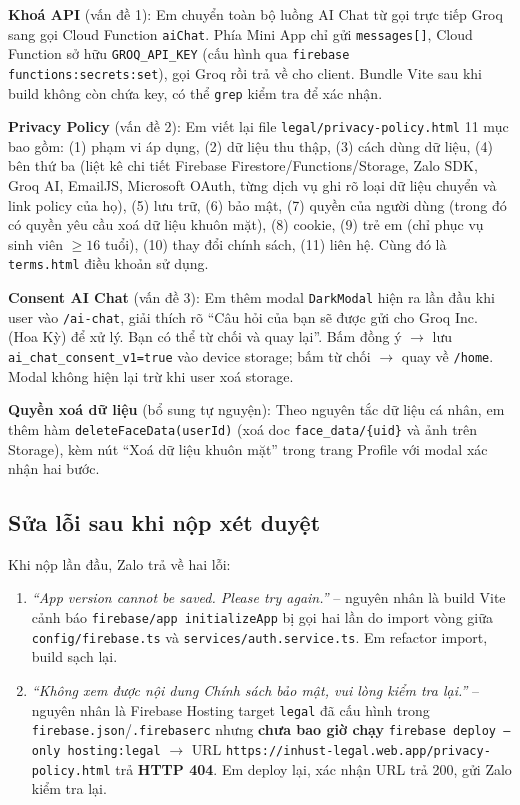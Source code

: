 \documentclass{article}
\begin{document}
\textbf{Khoá API} (vấn đề 1): Em chuyển toàn bộ luồng AI Chat từ gọi trực tiếp Groq sang gọi Cloud Function \texttt{aiChat}. Phía Mini App chỉ gửi \texttt{messages[]}, Cloud Function sở hữu \texttt{GROQ\_API\_KEY} (cấu hình qua \texttt{firebase functions:secrets:set}), gọi Groq rồi trả về cho client. Bundle Vite sau khi build không còn chứa key, có thể \texttt{grep} kiểm tra để xác nhận.

\textbf{Privacy Policy} (vấn đề 2): Em viết lại file \texttt{legal/privacy-policy.html} 11 mục bao gồm: (1) phạm vi áp dụng, (2) dữ liệu thu thập, (3) cách dùng dữ liệu, (4) bên thứ ba (liệt kê chi tiết Firebase Firestore/Functions/Storage, Zalo SDK, Groq AI, EmailJS, Microsoft OAuth, từng dịch vụ ghi rõ loại dữ liệu chuyển và link policy của họ), (5) lưu trữ, (6) bảo mật, (7) quyền của người dùng (trong đó có quyền yêu cầu xoá dữ liệu khuôn mặt), (8) cookie, (9) trẻ em (chỉ phục vụ sinh viên $\geq 16$ tuổi), (10) thay đổi chính sách, (11) liên hệ. Cùng đó là \texttt{terms.html} điều khoản sử dụng.

\textbf{Consent AI Chat} (vấn đề 3): Em thêm modal \texttt{DarkModal} hiện ra lần đầu khi user vào \texttt{/ai-chat}, giải thích rõ ``Câu hỏi của bạn sẽ được gửi cho Groq Inc. (Hoa Kỳ) để xử lý. Bạn có thể từ chối và quay lại''. Bấm đồng ý $\to$ lưu \texttt{ai\_chat\_consent\_v1=true} vào device storage; bấm từ chối $\to$ quay về \texttt{/home}. Modal không hiện lại trừ khi user xoá storage.

\textbf{Quyền xoá dữ liệu} (bổ sung tự nguyện): Theo nguyên tắc dữ liệu cá nhân, em thêm hàm \texttt{deleteFaceData(userId)} (xoá doc \texttt{face\_data/\{uid\}} và ảnh trên Storage), kèm nút ``Xoá dữ liệu khuôn mặt'' trong trang Profile với modal xác nhận hai bước.

\subsection{Sửa lỗi sau khi nộp xét duyệt}

Khi nộp lần đầu, Zalo trả về hai lỗi:

\begin{enumerate}[leftmargin=1.5em]
  \item \textit{``App version cannot be saved. Please try again.''} -- nguyên nhân là build Vite cảnh báo \texttt{firebase/app initializeApp} bị gọi hai lần do import vòng giữa \texttt{config/firebase.ts} và \texttt{services/auth.service.ts}. Em refactor import, build sạch lại.
  \item \textit{``Không xem được nội dung Chính sách bảo mật, vui lòng kiểm tra lại.''} -- nguyên nhân là Firebase Hosting target \texttt{legal} đã cấu hình trong \texttt{firebase.json}/\texttt{.firebaserc} nhưng \textbf{chưa bao giờ chạy} \texttt{firebase deploy --only hosting:legal} $\to$ URL \texttt{https://inhust-legal.web.app/privacy-policy.html} trả \textbf{HTTP 404}. Em deploy lại, xác nhận URL trả 200, gửi Zalo kiểm tra lại.
\end{enumerate}
\end{document}
